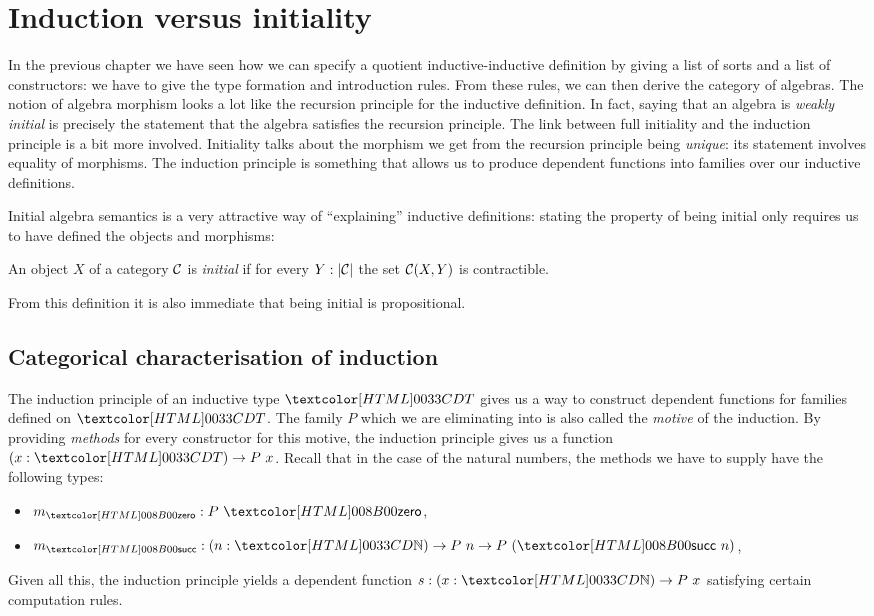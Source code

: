 \chapter{Induction versus initiality}
\label{induction}

In the previous chapter we have seen how we can specify a quotient
inductive-inductive definition by giving a list of sorts and a list of
constructors: we have to give the type formation and introduction
rules. From these rules, we can then derive the category of
algebras. The notion of algebra morphism looks a lot like the
recursion principle for the inductive definition. In fact, saying that
an algebra is \emph{weakly initial} is precisely the statement that
the algebra satisfies the recursion principle. The link between full
initiality and the induction principle is a bit more
involved. Initiality talks about the morphism we get from the
recursion principle being \emph{unique}: its statement involves
equality of morphisms. The induction principle is something that
allows us to produce dependent functions into families over our
inductive definitions.

Initial algebra semantics is a very attractive way of ``explaining''
inductive definitions: stating the property of being initial only
requires us to have defined the objects and morphisms:

\begin{definition}[Initiality]
  An object $X$ of a category $\mathcal{C}$ is \emph{initial} if for every
  $Y : | \mathcal{C} |$ the set $\mathcal{C}(X,Y)$ is contractible.
\end{definition}

From this definition it is also immediate that being initial is
propositional.

\section{Categorical characterisation of induction}

The induction principle of an inductive type $\Tty$ gives us a way to
construct dependent functions for families defined on $\Tty$. The
family $P$ which we are eliminating into is also called the
\emph{motive} of the induction. By providing \emph{methods} for every
constructor for this motive, the induction principle gives us a
function $(x : \Tty) \to P\ x$. Recall that in the case of the natural
numbers, the methods we have to supply have the following types:
%
\begin{itemize}
\item $m_{\natzero} : P\ \natzero$,
\item $m_{\natsucc} : (n : \natty) \to P\ n \to P\ (\natsucc\ n)$,
\end{itemize}
%
Given all this, the induction principle yields a dependent function
$s : (x : \natty) \to P\ x$ satisfying certain computation rules.

